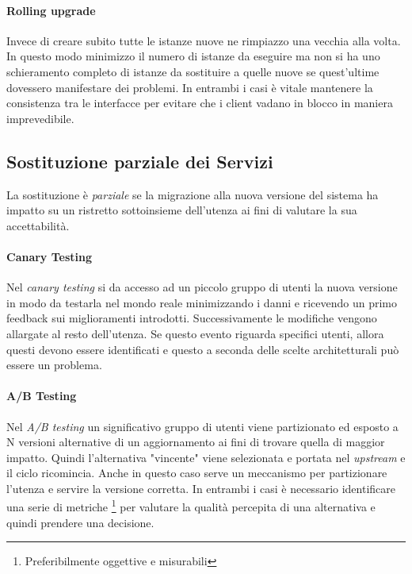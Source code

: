 \documentclass[a4paper,11pt,oneside, table]{article}
\begin{document}
  \paragraph{Rolling upgrade}

  Invece di creare subito tutte le istanze nuove ne rimpiazzo una vecchia alla volta. In questo modo minimizzo il numero di istanze da eseguire ma non si ha uno schieramento completo di istanze da sostituire a quelle nuove se quest'ultime dovessero manifestare dei problemi. In entrambi i casi \`e vitale mantenere la consistenza tra le interfacce per evitare che i client vadano in blocco in maniera imprevedibile.

  \subsection{Sostituzione parziale dei Servizi}

  La sostituzione \`e \textit{parziale} se la migrazione alla nuova versione del sistema ha impatto su un ristretto sottoinsieme dell'utenza ai fini di valutare la sua accettabilit\`a.

  \paragraph{Canary Testing}

  Nel \textit{canary testing} si da accesso ad un piccolo gruppo di utenti la nuova versione in modo da testarla nel mondo reale minimizzando i danni e ricevendo un primo feedback sui miglioramenti introdotti. Successivamente le modifiche vengono allargate al resto dell'utenza. Se questo evento riguarda specifici utenti, allora questi devono essere identificati e questo a seconda delle scelte architetturali pu\`o essere un problema.

  \paragraph{A/B Testing}

  Nel \textit{A/B testing} un significativo gruppo di utenti viene partizionato ed esposto a N versioni alternative di un aggiornamento ai fini di trovare quella di maggior impatto. Quindi l'alternativa "vincente" viene selezionata e portata nel \textit{upstream} e il ciclo ricomincia. Anche in questo caso serve un meccanismo per partizionare l'utenza e servire la versione corretta. In entrambi i casi \`e necessario identificare una serie di metriche \footnote{Preferibilmente oggettive e misurabili} per valutare la qualit\`a percepita di una alternativa e quindi prendere una decisione.

  \printbibliography[title={Bibliografia}]
  \printindex
\end{document}
